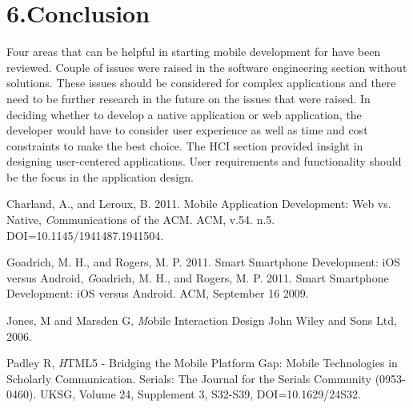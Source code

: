 \documentclass{article}
\begin{document}
\section{6.Conclusion}
Four areas that can be helpful in starting mobile development for have been reviewed. Couple of issues were raised in the software engineering section without solutions. These issues should be considered for complex applications and there need to be further research in the future on the issues that were raised. In deciding whether to develop a native application or web application, the developer would have to consider user experience as well as time and cost constraints to make the best choice. The HCI section provided insight in designing user-centered applications. User requirements and functionality should be the focus in the application design.  
\cleardoublepage

\begin{thebibliography}{9}


 Charland, A., and Leroux, B. 2011. Mobile Application Development: Web vs. Native,
  \textit
  Communications of the ACM. ACM,
  v.54. n.5. DOI=10.1145/1941487.1941504.

Goadrich, M. H., and Rogers, M. P. 2011. Smart Smartphone Development: iOS versus Android,
  \textit
  Goadrich, M. H., and Rogers, M. P. 2011. Smart Smartphone Development: iOS versus Android. ACM,
  September 16 2009.


 Jones, M and Marsden G,
  \textit
	Mobile Interaction Design John Wiley and Sons Ltd,
	2006.

Padley  R,
  \textit
	HTML5 - Bridging the Mobile Platform Gap: Mobile Technologies in Scholarly Communication. Serials: The Journal for the Serials 			Community (0953-0460). UKSG, Volume 24, Supplement 3, S32-S39,
	DOI=10.1629/24S32.


\end{thebibliography}




\end{document}
